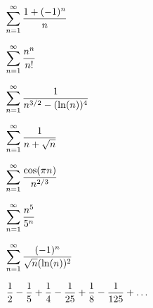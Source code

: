 \documentclass{ximera}
\theoremstyle{definition}
\newcommand{\dsum}{\displaystyle \sum}
\newcommand{\dsumone}{\dsum_{n=1}^{\infty}}
\begin{document}
\begin{problem}$\dsumone \df{1+(-1)^n}{n}$
\begin{multipleChoice}
\end{multipleChoice}
\end{problem}
\begin{problem} $\dsumone \df{n^n}{n!}$
\begin{multipleChoice}
\end{multipleChoice}
	\end{problem}
\begin{problem} $\dsumone \df{1}{n^{3/2} - (\ln(n))^4}$
\begin{multipleChoice}
\end{multipleChoice}
\end{problem}
\begin{problem} $\dsumone \df{1}{n+\sqrt{n}}$
\begin{multipleChoice}
\end{multipleChoice}
\end{problem}
\begin{problem} $\dsumone \df{\cos(\pi n)}{n^{2/3}}$
\begin{multipleChoice}
\end{multipleChoice}
\end{problem}
\begin{problem} $\dsumone \df{n^5}{5^n}$
\begin{multipleChoice}
\end{multipleChoice}
\end{problem}
\begin{problem} $\dsumone \df{(-1)^{n}}{\sqrt{n}(\ln(n))^2}$
\begin{multipleChoice}
\end{multipleChoice}
\end{problem}
\begin{problem} $\displaystyle\frac{1}{2} - \displaystyle\frac{1}{5} + \displaystyle\frac{1}{4} - \displaystyle\frac{1}{25} + \displaystyle\frac{1}{8} - \displaystyle\frac{1}{125} + \dots$
\begin{multipleChoice}
\end{multipleChoice}
\end{problem}
\end{document}
